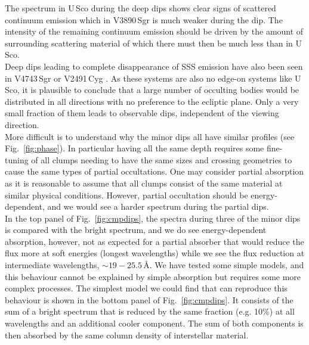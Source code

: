 \documentclass{aa}
\begin{document}
The spectrum in U\,Sco during the deep dips shows clear signs of
scattered continuum emission which in V3890\,Sgr is much weaker
during the dip. The intensity of the remaining continuum emission
should be driven by the amount of surrounding scattering material
of which there must then be much less than in U\,Sco.\\

Deep dips leading to complete disappearance of SSS emission have also
been seen in V4743\,Sgr \citep{v4743} or V2491\,Cyg \citep{nessv2491}.
As these systems are also no edge-on systems like U\,Sco, it is
plausible to conclude that a large number of occulting bodies would be
distributed in all directions with no preference to the ecliptic plane.
Only a very small fraction of them leads to observable dips,
independent of the viewing direction.\\

More difficult is to understand why the minor dips all have similar
profiles (see Fig.~\ref{fig:phase}). In particular having all
the same depth requires some fine-tuning of all clumps needing to have
the same sizes and crossing geometries to cause the same types of
partial occultations.
One may consider partial absorption as it is reasonable to assume that
all clumps consist of the same material at similar physical conditions.
However, partial occultation should be energy-dependent, and we would see a
harder spectrum during the partial dips.\\

In the top panel of Fig.~\ref{fig:cmpdips},
the spectra during three of the minor dips is compared with the bright
spectrum, and we do see energy-dependent absorption, however, not as
expected for a partial absorber that would reduce the flux more at soft
energies (longest wavelengths) while we see the flux reduction
at intermediate wavelengths, $\sim 19-25.5$\,\AA. We have tested some simple models,
and this behaviour cannot be explained by simple absorption but requires
some more complex processes. The simplest model we could find that can
reproduce this behaviour is shown in the bottom panel of
Fig.~\ref{fig:cmpdips}. It consists of the sum of a bright spectrum
that is reduced by the same fraction (e.g. 10\%) at all
wavelengths and an additional cooler component. The sum of both components is
then absorbed by the same column density of interstellar material.\\
\end{document}
